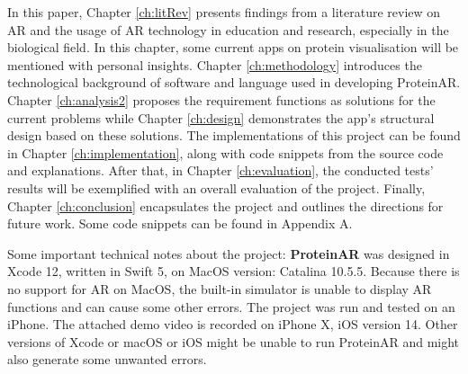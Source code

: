 In this paper, Chapter \ref{ch:litRev} presents findings from a literature review on AR and the usage of AR technology in education and research, especially in the biological field. In this chapter, some current apps on protein visualisation will be mentioned with personal insights. Chapter \ref{ch:methodology} introduces the technological background of software and language used in developing ProteinAR. Chapter \ref{ch:analysis2} proposes the requirement functions as solutions for the current problems while Chapter \ref{ch:design} demonstrates the app's structural design based on these solutions. The implementations of this project can be found in Chapter \ref{ch:implementation}, along with code snippets from the source code and explanations. After that, in Chapter \ref{ch:evaluation}, the conducted tests' results will be exemplified with an overall evaluation of the project. Finally, Chapter \ref{ch:conclusion} encapsulates the project and outlines the directions for future work. Some code snippets can be found in Appendix A.

Some important technical notes about the project:
\textbf{ProteinAR} was designed in Xcode 12, written in Swift 5, on MacOS version: Catalina 10.5.5. Because there is no support for AR on MacOS, the built-in simulator is unable to display AR functions and can cause some other errors. The project was run and tested on an iPhone. The attached demo video is recorded on iPhone X, iOS version 14. Other versions of Xcode or macOS or iOS might be unable to run ProteinAR and might also generate some unwanted errors. 

